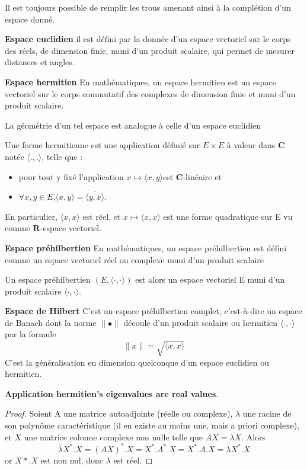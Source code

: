 Il est toujours possible de remplir les trous amenant ainsi \`a la compl\'etion d'un espace donn\'e.

\textbf{Espace euclidien}
il est d\'efini par la donn\'ee d'un espace vectoriel sur le corps des r\'eels, de dimension finie, muni d'un produit scalaire,
qui permet de mesurer distances et angles.

\textbf{Espace hermitien}
En math\'ematiques, un espace hermitien est un espace vectoriel sur le corps commutatif des complexes de dimension finie et muni d'un produit scalaire.

La g\'eom\'etrie d'un tel espace est analogue \`a celle d'un espace euclidien

Une forme hermitienne est une application d\'efini\'e sur $E \times E$ \`a valeur dans $\mathbf{C}$ not\'ee $\langle .,.\rangle$, telle que :
\begin{itemize}
		\item pour tout y fix\'e l'application $x \mapsto \langle x,y\rangle $est $\mathbf{C}$-lin\'eaire et
		\item $\forall x,y \in E$,$\langle x,y\rangle=\overline{ \langle y,x\rangle}$.
\end{itemize}
En particulier, $\langle x,x\rangle$ est r\'eel, et $x\mapsto \langle x,x\rangle$ est une forme quadratique sur E vu comme $\mathbf{R}$-espace vectoriel.

\textbf{Espace pr\'ehilbertien}
En math\'ematiques, un espace pr\'ehilbertien est d\'efini comme un espace vectoriel r\'eel ou complexe muni d'un produit scalaire

Un espace pr\'ehilbertien $(E,\langle\cdot,\cdot\rangle)$ est alors un espace vectoriel E muni d'un produit scalaire $\langle\cdot,\cdot\rangle$.

\textbf{Espace de Hilbert}
C'est un espace pr\'ehilbertien complet, c'est-\`a-dire un espace de Banach dont
la norme $\parallel\bullet\parallel$ d\'ecoule d'un produit scalaire ou hermitien $\langle\cdot,\cdot\rangle$ par la formule
$$\parallel x\parallel = \sqrt{\langle x,x \rangle}$$
C'est la g\'en\'eralisation en dimension quelconque d'un espace euclidien ou hermitien.
\bigskip

\textbf{Application hermitien's eigenvalues are real values}.
\begin{proof}
Soient A une matrice autoadjointe (r\'eelle ou complexe), $\lambda$ une racine de son polyn\^ome caract\'eristique (il en existe au moins une,
mais a priori complexe), et $X$ une matrice colonne complexe non nulle telle que
$AX=\lambda X$. Alors
$$ \overline\lambda X^*.X=(AX)^*.X=X^*.A^*.X=X^*.A.X=\lambda X^*.X $$
or $X*.X$ est non nul, donc $\lambda$ est r\'eel.
\end{proof}

